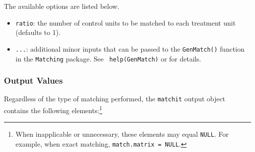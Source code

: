 The available options are listed below.
\begin{itemize}
\item {\tt ratio}: the number of control units to be matched
  to each treatment unit (defaults to 1). 
\item {\tt ...}: additional minor inputs that can be passed to the
  {\tt GenMatch()} function in the {\tt Matching} package. See {\tt
    help(GenMatch)} or
  for details.
\end{itemize}

\subsubsection{Output Values}
\label{sec:outputs}

Regardless of the type of matching performed, the \texttt{matchit}
output object contains the following elements:\footnote{When
inapplicable or unnecessary, these elements may equal {\tt NULL}.  For
example, when exact matching, {\tt match.matrix = NULL}.}

